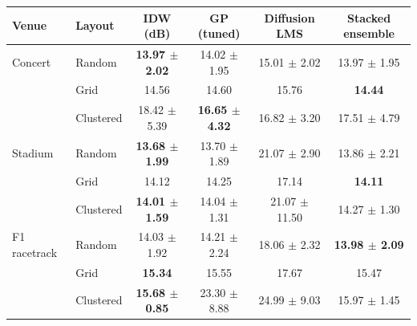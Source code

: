 \begin{tabular}{llcccc}
\toprule
Venue & Layout & IDW (dB) & GP (tuned) & Diffusion LMS & Stacked ensemble \\
\midrule
Concert & Random & \textbf{13.97 $\pm$ 2.02} & 14.02 $\pm$ 1.95 & 15.01 $\pm$ 2.02 & 13.97 $\pm$ 1.95 \\
 & Grid & 14.56 & 14.60 & 15.76 & \textbf{14.44} \\
 & Clustered & 18.42 $\pm$ 5.39 & \textbf{16.65 $\pm$ 4.32} & 16.82 $\pm$ 3.20 & 17.51 $\pm$ 4.79 \\
\midrule
Stadium & Random & \textbf{13.68 $\pm$ 1.99} & 13.70 $\pm$ 1.89 & 21.07 $\pm$ 2.90 & 13.86 $\pm$ 2.21 \\
 & Grid & 14.12 & 14.25 & 17.14 & \textbf{14.11} \\
 & Clustered & \textbf{14.01 $\pm$ 1.59} & 14.04 $\pm$ 1.31 & 21.07 $\pm$ 11.50 & 14.27 $\pm$ 1.30 \\
\midrule
F1 racetrack & Random & 14.03 $\pm$ 1.92 & 14.21 $\pm$ 2.24 & 18.06 $\pm$ 2.32 & \textbf{13.98 $\pm$ 2.09} \\
 & Grid & \textbf{15.34} & 15.55 & 17.67 & 15.47 \\
 & Clustered & \textbf{15.68 $\pm$ 0.85} & 23.30 $\pm$ 8.88 & 24.99 $\pm$ 9.03 & 15.97 $\pm$ 1.45 \\
\bottomrule
\end{tabular}
